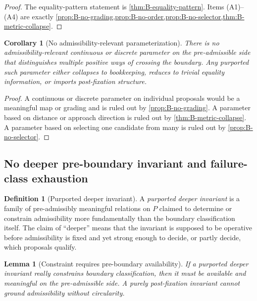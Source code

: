 \documentclass[11pt]{article}
\theoremstyle{plain}
\newtheorem{lemma}[theorem]{Lemma}
\newtheorem{corollary}[theorem]{Corollary}
\theoremstyle{definition}
\newtheorem{definition}[theorem]{Definition}
\begin{document}
\begin{proof}
The equality-pattern statement is \cref{thm:B-equality-pattern}. Items (A1)--(A4) are exactly \cref{prop:B-no-grading,prop:B-no-order,prop:B-no-selector,thm:B-metric-collapse}.
\end{proof}

\begin{corollary}[No admissibility-relevant parameterization]
\label{cor:B-no-parameterization}
There is no admissibility-relevant continuous or discrete parameter on the pre-admissible side that distinguishes multiple positive ways of crossing the boundary. Any purported such parameter either collapses to bookkeeping, reduces to trivial equality information, or imports post-fixation structure.
\end{corollary}

\begin{proof}
A continuous or discrete parameter on individual proposals would be a meaningful map or grading and is ruled out by \cref{prop:B-no-grading}. A parameter based on distance or approach direction is ruled out by \cref{thm:B-metric-collapse}. A parameter based on selecting one candidate from many is ruled out by \cref{prop:B-no-selector}.
\end{proof}

\subsection{No deeper pre-boundary invariant and failure-class exhaustion}

\begin{definition}[Purported deeper invariant]
A \emph{purported deeper invariant} is a family of pre-admissibly meaningful relations on $P$ claimed to determine or constrain admissibility more fundamentally than the boundary classification itself. The claim of ``deeper'' means that the invariant is supposed to be operative before admissibility is fixed and yet strong enough to decide, or partly decide, which proposals qualify.
\end{definition}

\begin{lemma}[Constraint requires pre-boundary availability]
\label{lem:B-preboundary}
If a purported deeper invariant really constrains boundary classification, then it must be available and meaningful on the pre-admissible side. A purely post-fixation invariant cannot ground admissibility without circularity.
\end{lemma}
\end{document}
